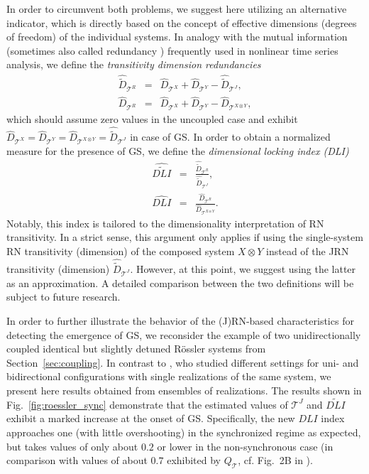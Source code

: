 In order to circumvent both problems, we suggest here utilizing an alternative indicator, which is directly based on the concept of effective dimensions (degrees of freedom) of the individual systems. In analogy with the mutual information (sometimes also called redundancy \cite{Palus1995,Prichard1995}) frequently used in nonlinear time series analysis, we define the \emph{transitivity dimension redundancies}
\begin{eqnarray}
\hat{\tilde{D}}_{\mathcal{T}^R}&=&\hat{D}_{\mathcal{T}^X}+\hat{D}_{\mathcal{T}^Y}-\hat{\tilde{D}}_{\mathcal{T}^J}, \\
\hat{D}_{\mathcal{T}^R}&=&\hat{D}_{\mathcal{T}^X}+\hat{D}_{\mathcal{T}^Y}-\hat{D}_{\mathcal{T}^{X\otimes Y}},
\end{eqnarray}
\noindent
which should assume zero values in the uncoupled case and exhibit $\hat{D}_{\mathcal{T}^X}=\hat{D}_{\mathcal{T}^Y}=\hat{D}_{\mathcal{T}^{X\otimes Y}}=\hat{\tilde{D}}_{\mathcal{T}^J}$ in case of GS. In order to obtain a normalized measure for the presence of GS, we define the \emph{dimensional locking index (DLI)}
\begin{eqnarray}
\widehat{\widetilde{DLI}} &=& \frac{\hat{\tilde{D}}_{\mathcal{T}^R}}{\hat{\tilde{D}}_{\mathcal{T}^J}}, \\
\widehat{DLI} &=& \frac{\hat{D}_{\mathcal{T}^R}}{\hat{D}_{\mathcal{T}^{X\otimes Y}}}.
\end{eqnarray}
\noindent
Notably, this index is tailored to the dimensionality interpretation of RN transitivity. In a strict sense, this argument only applies if using the single-system RN transitivity (dimension) of the composed system $X\otimes Y$ instead of the JRN transitivity (dimension) $\hat{\tilde{D}}_{\mathcal{T}^J}$. However, at this point, we suggest using the latter as an approximation. A detailed comparison between the two definitions will be subject to future research.

In order to further illustrate the behavior of the (J)RN-based characteristics for detecting the emergence of GS, we reconsider the example of two unidirectionally coupled identical but slightly detuned R\"ossler systems from Section~\ref{sec:coupling}. In contrast to \cite{Feldhoff2013}, who studied different settings for uni- and bidirectional configurations with single realizations of the same system, we present here results obtained from ensembles of realizations. The results shown in Fig.~\ref{fig:roessler_sync} demonstrate that the estimated values of $\mathcal{T}^J$ and $\widetilde{DLI}$ exhibit a marked increase at the onset of GS. Specifically, the new $DLI$ index approaches one (with little overshooting) in the synchronized regime as expected, but takes values of only about $0.2$ or lower in the non-synchronous case (in comparison with values of about $0.7$ exhibited by $Q_{\mathcal{T}}$, cf. Fig.~2B in \cite{Feldhoff2013}). 

